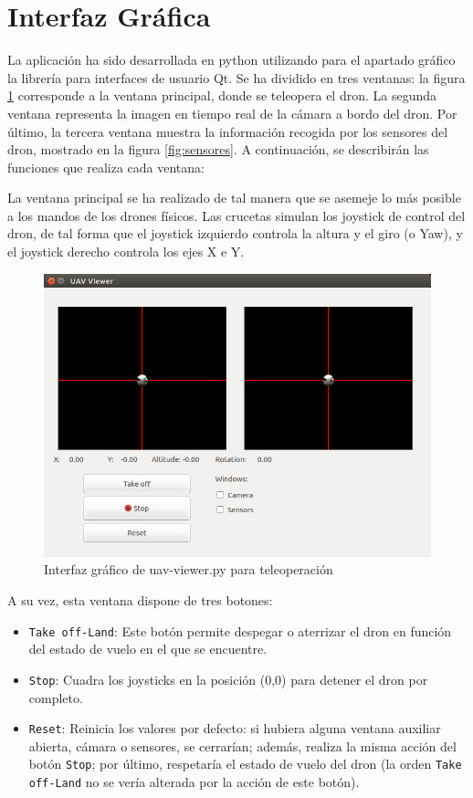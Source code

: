 \section{Interfaz Gráfica}

La aplicación ha sido desarrollada en python utilizando para el apartado gráfico la librería
para interfaces de usuario Qt. Se ha dividido en tres ventanas: la figura \ref{fig:interfazUavViewer} corresponde a la ventana principal, donde se teleopera el dron. La segunda ventana representa la imagen en tiempo real de la cámara a bordo del dron. Por último, la tercera ventana muestra la información recogida por los sensores del dron, mostrado en la figura \ref{fig:sensores}. A continuación, se describirán las funciones que realiza cada ventana:

La ventana principal se ha realizado de tal manera que se asemeje lo más posible a los mandos de los drones físicos. Las crucetas simulan los joystick de control del dron, de tal forma que el joystick izquierdo controla la altura y el giro (o Yaw), y el joystick derecho controla los ejes X e Y. 

\begin{figure}[H]
  \centering
  \includegraphics[scale=0.35]{imagenes/Uav_viewer_py.png}
  \caption{Interfaz gráfico de uav-viewer.py para teleoperación}
  \label{fig:interfazUavViewer}
\end{figure}

A su vez, esta ventana dispone de tres botones:
\begin{itemize}
\item \texttt{Take off-Land}: Este botón permite despegar o aterrizar el dron en función del estado de vuelo en el que se encuentre.
\item \texttt{Stop}: Cuadra los joysticks en la posición (0,0) para detener el dron por completo.
\item \texttt{Reset}: Reinicia los valores por defecto: si hubiera alguna ventana auxiliar abierta, cámara o sensores, se cerrarían; además, realiza la misma acción del botón \texttt{Stop}; por último, respetaría el estado de vuelo del dron (la orden \texttt{Take off-Land} no se vería alterada por la acción de este botón).
\end{itemize}

